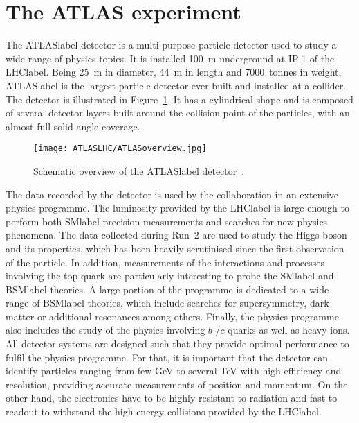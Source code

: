\section{The ATLAS experiment}

The \acrshort{ATLASlabel} detector is a multi-purpose particle detector used to study a wide range of physics topics. It is installed 100~m underground at IP-1 of the \acrshort{LHClabel}. Being 25~m in diameter, 44~m in length and 7000~tonnes in weight, \acrshort{ATLASlabel} is the largest particle detector ever built and installed at a collider. The detector is illustrated in Figure~\ref{figLHC:ATLAS}. It has a cylindrical shape and is composed of several detector layers built around the collision point of the particles, with an almost full solid angle coverage.\\

\begin{figure}[htbp]
    \RawFloats
    \begin{center}
    \texttt{[image: ATLASLHC/ATLASoverview.jpg]}
    \caption{
        Schematic overview of the \acrshort{ATLASlabel} detector~\cite{Collaboration_2008}. 
    }
    \label{figLHC:ATLAS}
    \end{center}
\end{figure}

The data recorded by the detector is used by the collaboration in an extensive physics programme. The luminosity provided by the \acrshort{LHClabel} is large enough to perform both \acrshort{SMlabel} precision measurements and searches for new physics phenomena. The data collected during Run~2 are used to study the Higgs boson and its properties, which has been heavily scrutinised since the first observation of the particle. In addition, measurements of the interactions and processes involving the top-quark are particularly interesting to probe the \acrshort{SMlabel} and \acrshort{BSMlabel} theories. A large portion of the programme is dedicated to a wide range of \acrshort{BSMlabel} theories, which include searches for supersymmetry, dark matter or additional resonances among others. Finally, the physics programme also includes the study of the physics involving $b$-/$c$-quarks as well as heavy ions.\\

All detector systems are designed such that they provide optimal performance to fulfil the physics programme. For that, it is important that the detector can identify particles ranging from few GeV to several TeV with high efficiency and resolution, providing accurate measurements of position and momentum. On the other hand, the electronics have to be highly resistant to radiation and fast to readout to withstand the high energy collisions provided by the \acrshort{LHClabel}.\\

